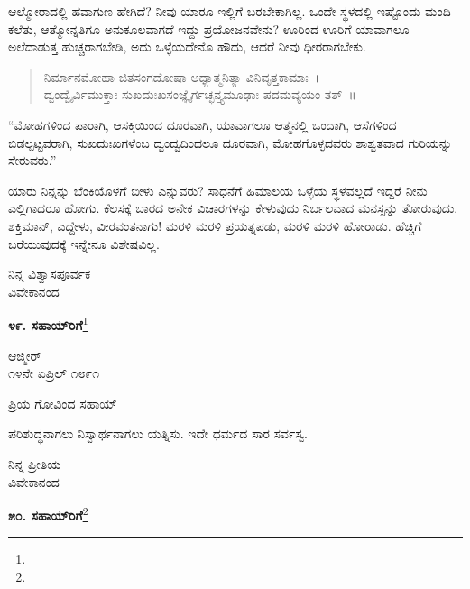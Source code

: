 ಆಲ್ಮೋರಾದಲ್ಲಿ ಹವಾಗುಣ ಹೇಗಿದೆ? ನೀವು ಯಾರೂ ಇಲ್ಲಿಗೆ ಬರಬೇಕಾಗಿಲ್ಲ. ಒಂದೇ ಸ್ಥಳದಲ್ಲಿ ಇಷ್ಟೊಂದು ಮಂದಿ ಕಲೆತು, ಆತ್ಮೋನ್ನತಿಗೂ ಅನುಕೂಲವಾಗದೆ ಇದ್ದು ಪ್ರಯೋಜನವೇನು? ಊರಿಂದ ಊರಿಗೆ ಯಾವಾಗಲೂ ಅಲೆದಾಡುತ್ತ ಹುಚ್ಚರಾಗಬೇಡಿ, ಅದು ಒಳ್ಳೆಯದೇನೊ ಹೌದು, ಆದರೆ ನೀವು ಧೀರರಾಗಬೇಕು.
\begin{verse}
 ನಿರ್ಮಾನಮೋಹಾ ಜಿತಸಂಗದೋಷಾ ಅಧ್ಯಾತ್ಮನಿತ್ಯಾ ವಿನಿವೃತ್ತಕಾಮಾಃ~।\\
 ದ್ವಂದ್ವೈರ್ವಿಮುಕ್ತಾಃ ಸುಖದುಃಖಸಂಜ್ಞೈರ್ಗಚ್ಛನ್ತ್ಯಮೂಢಾಃ ಪದಮವ್ಯಯಂ ತತ್~॥ 
\end{verse}

\vspace{-0.45cm}


“ಮೋಹಗಳಿಂದ ಪಾರಾಗಿ, ಆಸಕ್ತಿಯಿಂದ ದೂರವಾಗಿ, ಯಾವಾಗಲೂ ಆತ್ಮನಲ್ಲಿ ಒಂದಾಗಿ, ಆಸೆಗಳಿಂದ ಬಿಡಲ್ಪಟ್ಟವರಾಗಿ, ಸುಖದುಃಖಗಳೆಂಬ ದ್ವಂದ್ವದಿಂದಲೂ ದೂರವಾಗಿ, ಮೋಹಗೊಳ್ಳದವರು ಶಾಶ್ವತವಾದ ಗುರಿಯನ್ನು ಸೇರುವರು.”

ಯಾರು ನಿನ್ನನ್ನು ಬೆಂಕಿಯೊಳಗೆ ಬೀಳು ಎನ್ನುವರು? ಸಾಧನೆಗೆ ಹಿಮಾಲಯ ಒಳ್ಳೆಯ ಸ್ಥಳವಲ್ಲದೆ ಇದ್ದರೆ ನೀನು ಎಲ್ಲಿಗಾದರೂ ಹೋಗು. ಕೆಲಸಕ್ಕೆ ಬಾರದ ಅನೇಕ ವಿಚಾರಗಳನ್ನು ಕೇಳುವುದು ನಿರ್ಬಲವಾದ ಮನಸ್ಸನ್ನು ತೋರುವುದು. ಶಕ್ತಿಮಾನ್, ಎದ್ದೇಳು, ವೀರವಂತನಾಗು! ಮರಳಿ ಮರಳಿ ಪ್ರಯತ್ನಪಡು, ಮರಳಿ ಮರಳಿ ಹೋರಾಡು. ಹೆಚ್ಚಿಗೆ ಬರೆಯುವುದಕ್ಕೆ ಇನ್ನೇನೂ ವಿಶೇಷವಿಲ್ಲ.

\vspace{-0.45cm}

{\flushright
ನಿನ್ನ ವಿಶ್ವಾಸಪೂರ್ವಕ\\ವಿವೇಕಾನಂದ\par}

\begin{center}
\textbf{೪೯. ಸಹಾಯ್‌ರಿಗೆ}\footnote{}
\end{center}

\vspace{-0.65cm}

\begin{flushright}
ಆಜ್ಮೀರ್\\೧೪ನೇ ಏಪ್ರಿಲ್ ೧೮೯೧
\end{flushright}

\noindent
ಪ್ರಿಯ ಗೋವಿಂದ ಸಹಾಯ್

ಪರಿಶುದ್ಧನಾಗಲು ನಿಸ್ವಾರ್ಥನಾಗಲು ಯತ್ನಿಸು. ಇದೇ ಧರ್ಮದ ಸಾರ ಸರ್ವಸ್ವ.

\vspace{-0.25cm}

{\flushright
ನಿನ್ನ ಪ್ರೀತಿಯ\\ವಿವೇಕಾನಂದ\par}

\begin{center}
\textbf{೫೦. ಸಹಾಯ್‌ರಿಗೆ}\footnote{}
\end{center}

